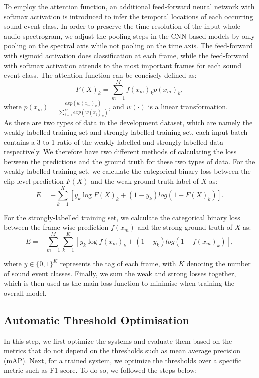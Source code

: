 To employ the attention function, an additional feed-forward neural network with softmax activation is introduced to infer the temporal locations of each occurring sound event class. In order to preserve the time resolution of the input whole audio spectrogram, we adjust the pooling steps in the CNN-based models by only pooling on the spectral axis while not pooling on the time axis. The feed-forward with sigmoid activation does classification at each frame, while the feed-forward with softmax activation attends to the most important frames for each sound event class. The attention function can be concisely defined as:
\begin{equation}
F(X)_k = \sum^M_{m=1}f(x_m)_k p(x_m)_k ,
\end{equation}
where \(p(x_m) = \frac{exp(w(x_m)_k)}{\sum^M_{j=1}exp(w(x_j)_k)}\), and \(w(\cdot)\) is a linear transformation.\\

As there are two types of data in the development dataset, which are namely the weakly-labelled training set and strongly-labelled training set, each input batch contains a 3 to 1 ratio of the weakly-labelled and strongly-labelled data respectively. We therefore have two different methods of calculating the loss between the predictions and the ground truth for these two types of data.  For the weakly-labelled training set, we calculate the categorical binary loss between the clip-level prediction \(F(X)\) and the weak ground truth label of \(X\) as:
\begin{equation}
E = -\sum^K_{k=1}[y_k\log{F(X)_k} + (1 - y_k)log(1 - F(X)_k)] .
\end{equation}

For the strongly-labelled training set, we calculate the categorical binary loss between the frame-wise prediction \(f(x_m)\) and the strong ground truth of \(X\) as:
\begin{equation}
E = -\sum^M_{m=1} \sum^K_{k=1}[y_k\log{f(x_m)_k} + (1 - y_k)log(1 - f(x_m)_k)],
\end{equation}

where \(y \in \{0, 1\}^K\) represents the tag of each frame, with \(K\) denoting the number of sound event classes. Finally, we sum the weak and strong losses together, which is then used as the main loss function to minimise when training the overall model.

\subsection{Automatic Threshold Optimisation}
In this step, we first optimize the systems and evaluate them based on the metrics that do not depend on the thresholds such as mean average precision (mAP). Next, for a trained system, we optimize the thresholds over a specific metric such as F1-score. To do so, we followed the steps below:

